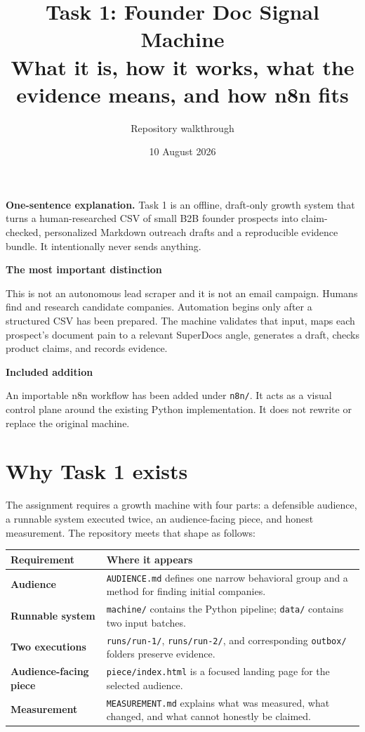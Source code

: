 \documentclass[11pt,a4paper]{article}
\title{\vspace{-18mm}\textbf{Task 1: Founder Doc Signal Machine}\\[4pt]\large What it is, how it works, what the evidence means, and how n8n fits}
\author{Repository walkthrough}
\date{10 August 2026}
\newcommand{\pathcode}[1]{\texttt{#1}}
\begin{document}
\maketitle
\thispagestyle{empty}

\begin{center}
\colorbox{Soft}{\parbox{0.91\textwidth}{
\textbf{One-sentence explanation.} Task 1 is an offline, draft-only growth system that turns a human-researched CSV of small B2B founder prospects into claim-checked, personalized Markdown outreach drafts and a reproducible evidence bundle. It intentionally never sends anything.
}}
\end{center}

\vfill
\textbf{The most important distinction}

This is not an autonomous lead scraper and it is not an email campaign. Humans find and research candidate companies. Automation begins only after a structured CSV has been prepared. The machine validates that input, maps each prospect's document pain to a relevant SuperDocs angle, generates a draft, checks product claims, and records evidence.

\textbf{Included addition}

An importable n8n workflow has been added under \pathcode{n8n/}. It acts as a visual control plane around the existing Python implementation. It does not rewrite or replace the original machine.

\newpage
\tableofcontents
\newpage

\section{Why Task 1 exists}

The assignment requires a growth machine with four parts: a defensible audience, a runnable system executed twice, an audience-facing piece, and honest measurement. The repository meets that shape as follows:

\begin{tabularx}{\textwidth}{>{\bfseries}p{} X}
\toprule
Requirement & Where it appears \\
\midrule
Audience & \pathcode{AUDIENCE.md} defines one narrow behavioral group and a method for finding initial companies. \\
Runnable system & \pathcode{machine/} contains the Python pipeline; \pathcode{data/} contains two input batches. \\
Two executions & \pathcode{runs/run-1/}, \pathcode{runs/run-2/}, and corresponding \pathcode{outbox/} folders preserve evidence. \\
Audience-facing piece & \pathcode{piece/index.html} is a focused landing page for the selected audience. \\
Measurement & \pathcode{MEASUREMENT.md} explains what was measured, what changed, and what cannot honestly be claimed. \\
\bottomrule
\end{tabularx}
\end{document}

